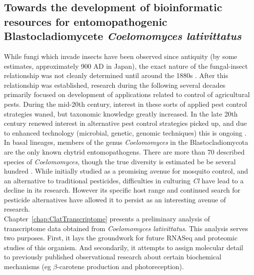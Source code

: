\subsection*{Towards the development of bioinformatic resources for entomopathogenic Blastocladiomycete \textit{Coelomomyces lativittatus}}
While fungi which invade insects have been observed since antiquity 
(by some estimates, approximately 900 AD in Japan), the exact nature 
of the fungal-insect relationship was not cleanly determined until 
around the 1880s \cite{Samson1988}. After this relationship was established, 
research during the following several decades primarily focused on 
development of applications related to control of agricultural pests. During 
the mid-20th century, interest in these sorts of applied pest control strategies 
waned, but taxonomic knowledge greatly increased. In the late 20th century renewed 
interest in alternative pest control strategies picked up, and due to enhanced 
technology (microbial, genetic, genomic techniques) this is ongoing \cite{Samson1988}.\\
\indent In basal lineages, members of the genus \textit{Coelomomyces} in the
Blastocladiomycota are the only known chytrid entomopathogens. There are
more than 70 described species of \textit{Coelomomyces}, though the true
diversity is estimated be be several hundred \cite{Couch1985}. While
initially studied as a promising avenue for mosquito control, and an
alternative to traditional pesticides, difficulties in culturing
\textit{Cl} have lead to a decline in its research. However its
specific host range and continued search for pesticide alternatives
have allowed it to persist as an interesting avenue of research.\\
\indent Chapter~\ref{chap:ClatTranscriptome} presents a preliminary analysis of transcriptome data obtained from \textit{Coelomomyces lativittatus}. This analysis serves two purposes. First, it lays the groundwork for future RNASeq and proteomic studies of this organism. And secondarily, it attempts to assign molecular detail to previously published observational research about certain biochemical mechanisms (eg $\beta$-carotene production and photoreception).\\
